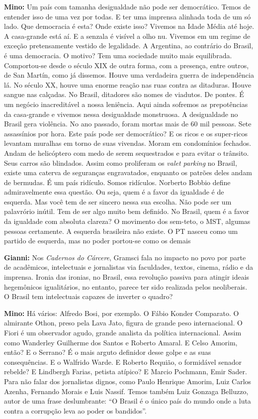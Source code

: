 \textbf{Mino:} Um país com tamanha desigualdade não pode ser
democrático. Temos de entender isso de uma vez por todas. E ter uma
imprensa alinhada toda de um só lado. Que democracia é esta? Onde existe
isso? Vivemos na Idade Média até hoje. A casa-grande está aí. E a
senzala é visível a olho nu. Vivemos em um regime de exceção
pretensamente vestido de legalidade. A Argentina, ao contrário do
Brasil, é uma democracia. O motivo? Tem uma sociedade muito mais
equilibrada. Comportou-se desde o século XIX de outra forma, com a
presença, entre outros, de San Martín, como já dissemos. Houve uma
verdadeira guerra de independência lá. No século XX, houve uma enorme
reação nas ruas contra as ditaduras. Houve sangue nas calçadas. No
Brasil, ditadores são nomes de viadutos. De pontes. É um negócio
inacreditável a nossa leniência. Aqui ainda sofremos as prepotências da
casa-grande e vivemos nessa desigualdade monstruosa. A desigualdade no
Brasil gera violência. No ano passado, foram mortas mais de 60 mil
pessoas. Sete assassínios por hora. Este país pode ser democrático? E os
ricos e os super-ricos levantam muralhas em torno de suas vivendas.
Moram em condomínios fechados. Andam de helicóptero com medo de serem
sequestrados e para evitar o trânsito. Seus carros são blindados. Assim
como proliferam os \emph{valet parking} no Brasil, existe uma caterva de
seguranças engravatados, enquanto os patrões deles andam de bermudas. É
um país ridículo. Somos ridículos. Norberto Bobbio define admiravelmente
essa questão. Ou seja, quem é a favor da igualdade é de esquerda. Mas
você tem de ser sincero nessa sua escolha. Não pode ser um palavrório
inútil. Tem de ser algo muito bem definido. No Brasil, quem é a favor da
igualdade com absoluta clareza? O movimento dos sem-teto, o MST, algumas
pessoas certamente. A esquerda brasileira não existe. O PT nasceu como
um partido de esquerda, mas no poder portou-se como os demais

\textbf{Gianni:} Nos \emph{Cadernos do Cárcere}, Gramsci fala no impacto
no povo por parte de acadêmicos, intelectuais e jornalistas via
faculdades, textos, cinema, rádio e da imprensa. Ironia das ironias, no
Brasil, essa revolução passiva para atingir ideais hegemônicos
igualitários, no entanto, parece ter sido realizada pelos neoliberais. O
Brasil tem intelectuais capazes de inverter o quadro?

\textbf{Mino:} Há vários: Alfredo Bosi, por exemplo. O Fábio Konder
Comparato. O almirante Othon, preso pela Lava Jato, figura de grande
peso internacional. O Fiori é um observador agudo, grande analista da
política internacional. Assim como Wanderley Guilherme dos Santos e
Roberto Amaral. E Celso Amorim, então? E o Serrano? É o mais arguto
definidor desse golpe e as suas consequências. E o Walfrido Warde. E
Roberto Requião, o formidável senador rebelde? E Lindbergh Farias,
petista atípico? E Marcio Pochmann, Emir Sader. Para não falar dos
jornalistas dignos, como Paulo Henrique Amorim, Luiz Carlos Azenha,
Fernando Morais e Luis Nassif. Temos também Luiz Gonzaga Belluzzo, autor
de uma frase deslumbrante: ``O Brasil é o único país do mundo onde a
luta contra a corrupção leva ao poder os bandidos''.

